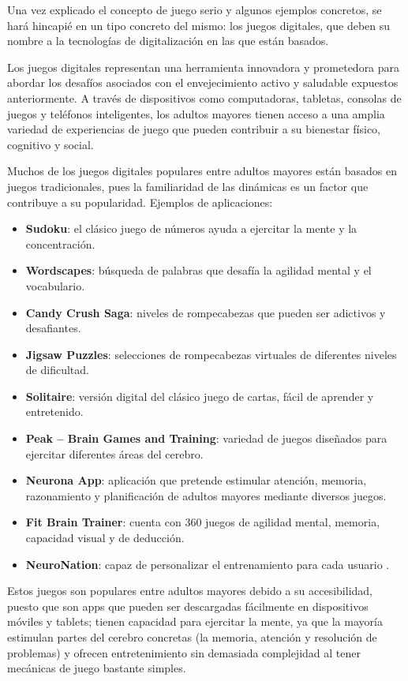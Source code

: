 Una vez explicado el concepto de juego serio y algunos ejemplos concretos, se hará hincapié en un tipo concreto del mismo: los juegos digitales, que deben su nombre a la tecnologías de digitalización en las que están basados.

Los juegos digitales representan una herramienta innovadora y prometedora para abordar los desafíos asociados con el envejecimiento activo y saludable expuestos anteriormente. A través de dispositivos como computadoras, tabletas, consolas de juegos y teléfonos inteligentes, los adultos mayores tienen acceso a una amplia variedad de experiencias de juego que pueden contribuir a su bienestar físico, cognitivo y social.

Muchos de los juegos digitales populares entre adultos mayores están basados en juegos tradicionales, pues la familiaridad de las dinámicas es un factor que contribuye a su popularidad. Ejemplos de aplicaciones:
\begin{itemize}[leftmargin=1.5cm, topsep=2.2pt, itemsep=0.4pt]
    \item \textbf{Sudoku}: el clásico juego de números ayuda a ejercitar la mente y la concentración.
    \item \textbf{Wordscapes}: búsqueda de palabras que desafía la agilidad mental y el vocabulario.
    \item \textbf{Candy Crush Saga}: niveles de rompecabezas que pueden ser adictivos y desafiantes.
    \item \textbf{Jigsaw Puzzles}: selecciones de rompecabezas virtuales de diferentes niveles de dificultad.
    \item \textbf{Solitaire}: versión digital del clásico juego de cartas, fácil de aprender y entretenido.
    \item \textbf{Peak – Brain Games and Training}: variedad de juegos diseñados para ejercitar diferentes áreas del cerebro.
    \item \textbf{Neurona App}: aplicación que pretende estimular atención, memoria, razonamiento y planificación de adultos mayores mediante diversos juegos.
    \item \textbf{Fit Brain Trainer}: cuenta con 360 juegos de agilidad mental, memoria, capacidad visual y de deducción.
    \item \textbf{NeuroNation}: capaz de personalizar el entrenamiento para cada usuario \parencite{juegosMem1}.
\end{itemize}

Estos juegos son populares entre adultos mayores debido a su accesibilidad, puesto que son apps que pueden ser descargadas fácilmente en dispositivos móviles y tablets; tienen capacidad para ejercitar la mente, ya que la mayoría estimulan partes del cerebro concretas (la memoria, atención y resolución de problemas) y ofrecen entretenimiento sin demasiada complejidad al tener mecánicas de juego bastante simples.

